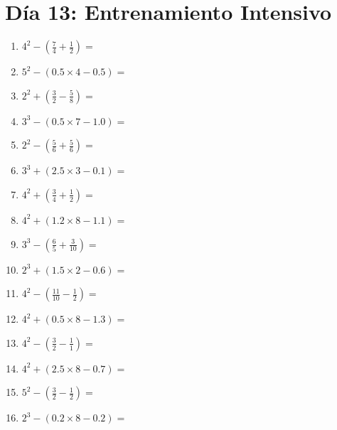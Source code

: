 \documentclass[12pt]{article}
\begin{document}
\section*{Día 13: Entrenamiento Intensivo}
\begin{enumerate}
\item \large $ 4^{2} - (\frac{7}{4} + \frac{1}{2}) = $ \vspace{1.6cm}
\item \large $ 5^{2} - (0.5 \times 4 - 0.5) = $ \vspace{1.6cm}
\item \large $ 2^{2} + (\frac{3}{2} - \frac{5}{8}) = $ \vspace{1.6cm}
\item \large $ 3^{3} - (0.5 \times 7 - 1.0) = $ \vspace{1.6cm}
\item \large $ 2^{2} - (\frac{5}{6} + \frac{5}{6}) = $ \vspace{1.6cm}
\item \large $ 3^{3} + (2.5 \times 3 - 0.1) = $ \vspace{1.6cm}
\item \large $ 4^{2} + (\frac{3}{4} + \frac{1}{2}) = $ \vspace{1.6cm}
\item \large $ 4^{2} + (1.2 \times 8 - 1.1) = $ \vspace{1.6cm}
\item \large $ 3^{3} - (\frac{6}{5} + \frac{3}{10}) = $ \vspace{1.6cm}
\item \large $ 2^{3} + (1.5 \times 2 - 0.6) = $ \vspace{1.6cm}
\newpage
\item \large $ 4^{2} - (\frac{11}{10} - \frac{1}{2}) = $ \vspace{1.6cm}
\item \large $ 4^{2} + (0.5 \times 8 - 1.3) = $ \vspace{1.6cm}
\item \large $ 4^{2} - (\frac{3}{2} - \frac{1}{1}) = $ \vspace{1.6cm}
\item \large $ 4^{2} + (2.5 \times 8 - 0.7) = $ \vspace{1.6cm}
\item \large $ 5^{2} - (\frac{3}{2} - \frac{1}{2}) = $ \vspace{1.6cm}
\item \large $ 2^{3} - (0.2 \times 8 - 0.2) = $ \vspace{1.6cm}

\end{enumerate}
\end{document}
